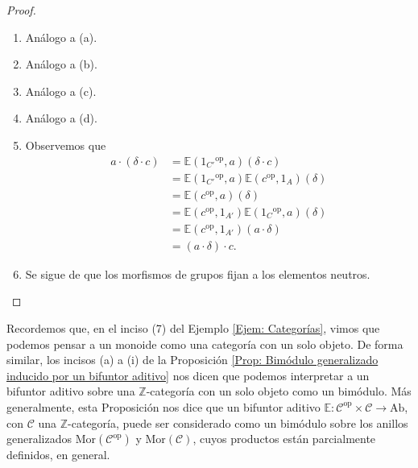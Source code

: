 \documentclass[tesis]{subfiles}
\begin{document}
\begin{proof}
\begin{enumerate}[label=(\alph*)]
        \item Análogo a (a).

        \item Análogo a (b).

        \item Análogo a (c).

        \item Análogo a (d).

        \item Observemos que
            \begin{align*}
                a\cdot(\delta\cdot c) &= \mathbb{E}(1_{C'}{}^\text{op},a)(\delta\cdot c) \\
                                      &= \mathbb{E}(1_{C'}{}^\text{op},a)\mathbb{E}(c^\text{op},1_A)(\delta) \\
                                      &= \mathbb{E}(c^\text{op},a)(\delta) \\
                                      &= \mathbb{E}(c^\text{op},1_{A'})\mathbb{E}(1_C{}^\text{op},a)(\delta) \\
                                      &= \mathbb{E}(c^\text{op}, 1_{A'})(a\cdot\delta) \\
                                      &= (a\cdot\delta)\cdot c.
            \end{align*}

        \item Se sigue de que los morfismos de grupos fijan a los elementos neutros.
    \end{enumerate}   
\end{proof}

\begin{Obs}\label{Obs: Bimódulo generalizado inducido por un bifuntor aditivo}
    Recordemos que, en el inciso (7) del Ejemplo \ref{Ejem: Categorías}, vimos que podemos pensar a un monoide como una categoría con un solo objeto. De forma similar, los incisos (a) a (i) de la Proposición \ref{Prop: Bimódulo generalizado inducido por un bifuntor aditivo} nos dicen que podemos interpretar a un bifuntor aditivo sobre una $\mathbb{Z}$-categoría con un solo objeto como un bimódulo. Más generalmente, esta Proposición nos dice que un bifuntor aditivo $\mathbb{E}:\mathscr{C}^\text{op}\times\mathscr{C}\to \text{Ab}$, con $\mathscr{C}$ una $\mathbb{Z}$-categoría, puede ser considerado como un bimódulo sobre los anillos generalizados $\text{Mor}(\mathscr{C}^\text{op})$ y $\text{Mor}(\mathscr{C})$, cuyos productos están parcialmente definidos, en general.
\end{Obs} %
\end{document}
